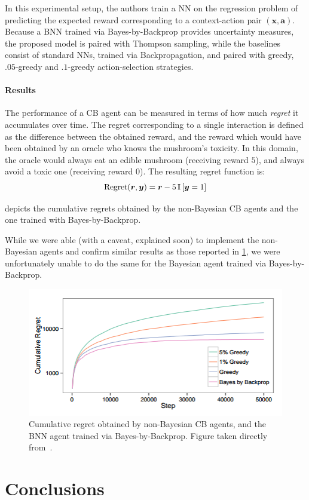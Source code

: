 \documentclass[11pt]{article}
\begin{document}
In this experimental setup, the authors train a NN on the regression problem of
predicting the expected reward corresponding to a context-action pair $(\bm x,
\bm a)$.  
Because a BNN trained via Bayes-by-Backprop provides
uncertainty measures, the proposed model is paired with Thompson sampling,
while the baselines consist of standard NNs, trained via Backpropagation, and
paired with greedy, $.05$-greedy and $.1$-greedy action-selection strategies.


\paragraph{Results} 

The performance of a CB agent can be measured in terms of how much
\emph{regret} it accumulates over time.  The regret corresponding to a single
interaction is defined as the difference between the obtained reward, and the
reward which would have been obtained by an oracle who knows the mushroom's
toxicity.  In this domain, the oracle would always eat an edible mushroom
(receiving reward $5$), and always avoid a toxic one (receiving reward $0$).
The resulting regret function is:
%
\begin{equation}
  \operatorname{Regret}(\bm r, \bm y) = \bm r - 5 \, {\mathbb{I}}\left[ \bm
  y = 1 \right]
\end{equation}

 depicts the cumulative regrets obtained by the
non-Bayesian CB agents and the one trained with Bayes-by-Backprop.  

While we were able (with a caveat, explained soon) to implement the
non-Bayesian agents and confirm similar results as those reported in
\cref{fig:cb_cumregret}, we were unfortunately unable to do the same for the
Bayesian agent trained via Bayes-by-Backprop.



\begin{figure}
  \centering\includegraphics[width=.5\textwidth]{figures/cb_cumregret.png}
  \caption{Cumulative regret obtained by non-Bayesian CB agents, and the BNN
  agent trained via Bayes-by-Backprop.  Figure taken directly
  from~\cite{blundell}.}\label{fig:cb_cumregret}
\end{figure}


\section{Conclusions}


 
\end{document}
